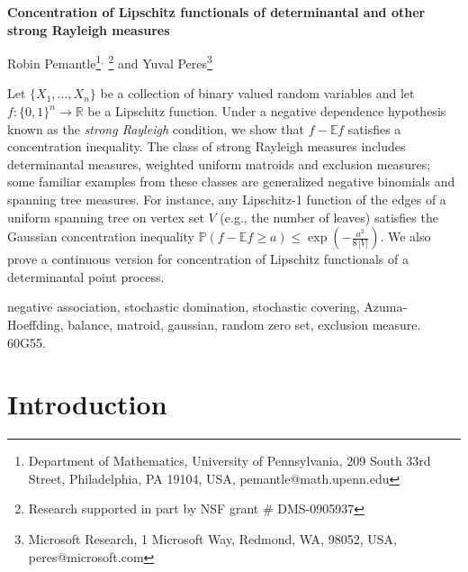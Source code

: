 \documentclass[10pt]{article}
\theoremstyle{plain}
\theoremstyle{remark}
\def\R{\mathbb{R}}
\def\E{{\mathbb E}}
\def\P{{\mathbb P}}
\def\disp{\displaystyle}
\begin{document}
\begin{titlepage}
\begin{center}
{\large \bf Concentration of Lipschitz functionals of determinantal
and other strong Rayleigh measures}
\\[5ex]
\end{center}

\begin{flushright}
Robin Pemantle\footnote{Department of Mathematics,
University of Pennsylvania,
209 South 33rd Street,
Philadelphia, PA 19104, USA, pemantle@math.upenn.edu}$^,$
\footnote{Research supported in part by NSF grant \# DMS-0905937}
and
Yuval Peres\footnote{Microsoft Research,
1 Microsoft Way, Redmond, WA, 98052, USA,
peres@microsoft.com}
\end{flushright}

\vfill

Let $\{ X_1 , \ldots , X_n \}$ be a collection of binary valued
random variables and let $f : \{ 0 , 1 \}^n \to \R$ be a Lipschitz
function.  Under a negative dependence hypothesis known as the
{\em strong Rayleigh} condition, we show that $f - \E f$
satisfies a concentration inequality.
The class of strong Rayleigh measures includes determinantal
measures, weighted uniform matroids and exclusion measures; some
familiar examples from these classes are generalized negative binomials
and spanning tree measures.  For instance, any Lipschitz-1 function
of the edges of a uniform spanning tree on vertex set $V$ (e.g.,
the number of leaves) satisfies the Gaussian concentration inequality
$\disp{\P (f - \E f \geq a) \leq \exp \left ( - \frac{a^2}{8 \, |V|}
\right ) }$.  We also prove a continuous version for concentration of
Lipschitz functionals of a determinantal point process.
\vfill

 negative association,
stochastic domination, stochastic covering, Azuma-Hoeffding,
balance, matroid, gaussian, random zero set, exclusion measure. \\[2ex]

 60G55. \\[2ex]

\end{titlepage}

\setcounter{equation}{0}
\section{Introduction}
\label{sec:intro}
\end{document}
